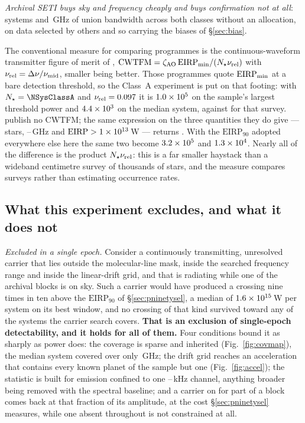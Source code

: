 \emph{Archival SETI buys sky and frequency cheaply and buys confirmation not
at all}: \NSystems{} systems and \UnionGHz\,GHz of union bandwidth across both
classes without an allocation, on data selected by others and so carrying the
biases of \S\ref{sec:bias}.

The conventional measure for comparing programmes is the continuous-waveform
transmitter figure of merit of \citet{Enriquez2017},
$\mathrm{CWTFM}=\zeta_{\rm AO}\,\mathrm{EIRP}_{\rm min}/
(N_{\star}\nu_{\rm rel})$ with $\nu_{\rm rel}=\Delta\nu/\nu_{\rm mid}$,
smaller being better. Those programmes quote $\mathrm{EIRP}_{\rm min}$ at a
bare detection threshold, so the Class~A experiment is put on that footing:
with $N_{\star}=\NSysClassA$ and
$\nu_{\rm rel}=0.097$ it is $1.0\times10^{5}$ on the sample's largest
threshold power and $4.4\times10^{3}$ on the median system, against
\FomLitEnriquez{} for that survey. \citet{Margot2023} publish no
CWTFM; the same expression on the three quantities they do give
--- \FomMargotN{} stars, \FomMargotLo--\FomMargotHi\,GHz and
$\mathrm{EIRP}>1\times10^{13}$\,W --- returns \FomLitMargot.
With the $\mathrm{EIRP}_{90}$ adopted
everywhere else here the same two become $3.2\times10^{5}$ and
$1.3\times10^{4}$. Nearly all of
the difference is the product $N_{\star}\nu_{\rm rel}$: this is a far smaller
haystack than a wideband centimetre survey of thousands of stars, and the
measure compares surveys rather than estimating occurrence rates.

\subsection{What this experiment excludes, and what it does not}
\label{sec:excludes}

\noindent\emph{Excluded in a single epoch.} Consider a continuously
transmitting, unresolved carrier that lies outside the molecular-line mask,
inside the searched frequency range and inside the linear-drift grid, and that
is radiating while one of the archival blocks is on sky. Such a carrier would
have produced a crossing nine times in ten above the $\mathrm{EIRP}_{90}$ of
\S\ref{sec:pninetysel}, a median of $1.6\times10^{15}$\,W per system on its
best window, and no crossing of that kind survived toward any of the
\NSysClassA{} systems the carrier search covers. \textbf{That is an exclusion
of single-epoch detectability, and it holds for all of them.} Four conditions
bound it as sharply as power does: the coverage is sparse and
inherited (Fig.~\ref{fig:covmap}), the median system covered over only
\SysUnionAMed\,GHz; the drift grid reaches an acceleration that contains every known planet of
the sample but one (Fig.~\ref{fig:accel}); the statistic is built for emission
confined to one \ChanLoA--\ChanHiA\,kHz channel, anything broader being removed
with the spectral baseline; and a carrier on for part of a block comes back at
that fraction of its amplitude, at the cost \S\ref{sec:pninetysel} measures,
while one absent throughout is not constrained at all.

